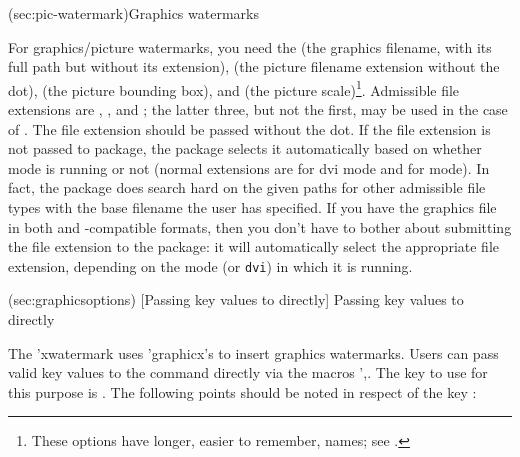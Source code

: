\documentclass[
  use-a4-paper,
  use-10pt-font,
  final-version,
  use-UK-English,
  fancy-section-headings,
  frame-section-numbers,
  para-abstract-style,
  input-config-file,
  no-hyperref-messages,
  option-stack-limit=4,
  inputfile=true,
]{amltxdoc}
\begin{document}
\docsection(sec:pic-watermark){Graphics watermarks}

For graphics/picture watermarks, you need the  (the graphics filename, with its full path but without its extension),  (the picture filename extension without the dot),  (the picture bounding box), and  (the picture scale)\footnote{These options have longer, easier to remember, names; see .}. Admissible file extensions are , ,  and ; the latter three, but not the first, may be used in the case of \pdftex. The file extension should be passed without the dot. If the file extension is not passed to package, the package selects it automatically based on whether \pdftex mode is running or not (normal extensions are  for dvi mode and  for \pdftex mode). In fact, the package does search hard on the given paths for other admissible file types with the base filename the user has specified. If you have the graphics file in both  and \pdf-compatible formats, then you don't have to bother about submitting the file extension to the package: it will automatically select the appropriate file extension, depending on the mode (\pdf or \texttt{dvi}) in which it is running.


\docsubsection(sec:graphicsoptions)
  [Passing key values to  directly]
  {Passing key values to  directly}

The \pkg'{xwatermark} uses \pkg'{graphicx}'s  to insert graphics watermarks.
Users can pass valid key values to the command  directly via the macros \ffx'{\newwatermark,\newwallpaper}. The key to use for this purpose is . The following points should be noted in respect of the key :
\end{document}
